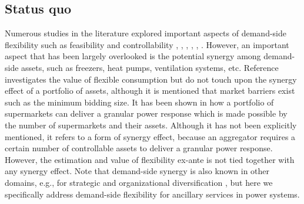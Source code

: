 \documentclass[conference]{IEEEtran}
\begin{document}

\vspace{1mm}
\subsection{Status quo}
\vspace{-1mm}
Numerous studies in the literature explored important aspects of demand-side flexibility such as feasibility and controllability \cite{bondy2018redefining}, \cite{bondy2017performance}, \cite{bondy2016procedure}, \cite{bondy2014performance}, \cite{biegel2014integration}, \cite{AchievingControllabilityofElectricLoads}. However, an important aspect that has been largely overlooked is the potential synergy among demand-side assets, such as freezers, heat pumps, ventilation systems, etc.
%
Reference \cite{biegel2014value} investigates the value of flexible consumption but do not touch upon the synergy effect of a portfolio of assets, although it is mentioned that market barriers exist such as the minimum bidding size.
%
It has been shown in \cite{pedersen2014aggregation} how a portfolio of supermarkets can deliver a granular power response which is made possible by the number of supermarkets and their assets. Although it has not been explicitly mentioned, it refers to a form of synergy effect, because an aggregator requires a certain number of controllable assets to deliver a granular power response. However, the estimation and value of flexibility ex-ante is not tied together with any synergy effect. Note that demand-side synergy is also known in other domains, e.g., for strategic and organizational diversification \cite{ye2012achieving}, but here we specifically address demand-side flexibility for ancillary services in power systems.
\end{document}
